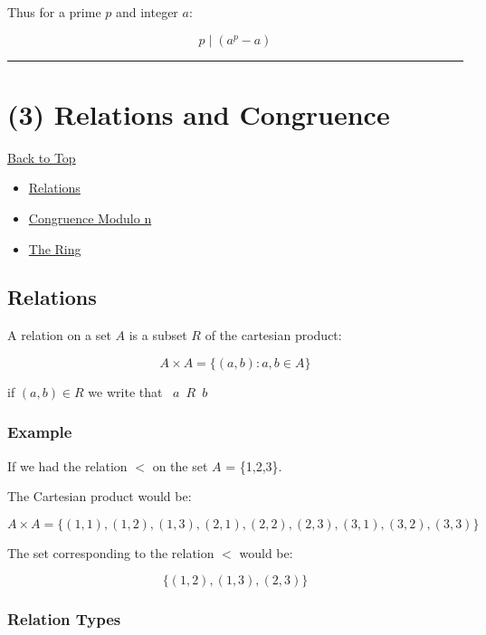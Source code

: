 \documentclass[
]{article}
\begin{document}
Thus for a prime \(p\) and integer \(a\):

\[p \mid (a^p - a)\]

\begin{center}\rule{0.5\linewidth}{\linethickness}\end{center}

\hypertarget{header-n302}{%
\section{(3) Relations and Congruence}\label{header-n302}}

\protect\hyperlink{antoc}{Back to Top}

\begin{itemize}
\item
  \protect\hyperlink{aaux283ux29rel}{Relations}
\item
  \protect\hyperlink{aaux283ux29con}{Congruence Modulo n}
\item
  \protect\hyperlink{aaux283ux29ringintro}{The Ring}
\end{itemize}

\hypertarget{header-n312}{%
\subsection{Relations}\label{header-n312}}

A relation on a set \(A\) is a subset \(R\) of the cartesian product:

\[A\times A = \{(a,b) : a,b \in A\}\]

if \((a,b) \in R\) we write that \(\enspace a \enspace R \enspace b\)

\hypertarget{header-n317}{%
\subsubsection{Example}\label{header-n317}}

If we had the relation \(<\) on the set \(A\) = \{1,2,3\}.

The Cartesian product would be:

\[A \times A = \{(1,1), (1,2), (1,3), (2,1), (2,2), (2, 3), (3, 1), (3, 2), (3,3)\}\]

The set corresponding to the relation \(<\) would be:

\[\{(1,2), (1, 3), (2, 3)\}\]

\hypertarget{header-n323}{%
\subsubsection{Relation Types}\label{header-n323}}
\end{document}
